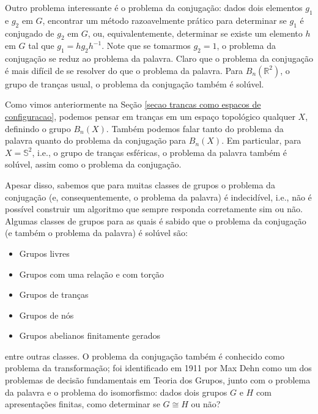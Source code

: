 	\par\vspace{0.3cm} Outro problema interessante é o problema da conjugação: dados dois elementos 
	$g_1$ e $g_2$ em $G$, encontrar um método razoavelmente prático para determinar se $g_1$ é conjugado de 
	$g_2$ em $G$, ou, equivalentemente, determinar se existe um elemento $h$ em $G$ tal que $g_1 = hg_2h^{-1}$. 
	Note que se tomarmos $g_2 = 1$, o problema da conjugação se reduz ao problema da palavra. Claro que o 
	problema da conjugação é mais difícil de se resolver do que o problema da palavra. Para $B_n(\mathbb{R}^2)$, 
	o grupo de tranças usual, o problema da conjugação também é solúvel.
	
	\par\vspace{0.3cm} Como vimos anteriormente na Seção \ref{secao trancas como espacos de configuracao}, 
	podemos pensar em tranças em um espaço topológico qualquer $X$, definindo o grupo $B_n(X)$. Também 
	podemos falar tanto do problema da palavra quanto do problema da conjugação para $B_n(X)$. Em particular, 
	para $X = \mathbb{S}^2$, i.e., o grupo de tranças esféricas, o problema da palavra também é solúvel, 
	assim como o problema da conjugação.
	
	\par\vspace{0.3cm} Apesar disso, sabemos que para muitas classes de grupos o problema da conjugação 
	(e, consequentemente, o problema da palavra) é indecidível, i.e., não é possível construir um algoritmo 
	que sempre responda corretamente sim ou não. Algumas classes de grupos para as quais é sabido que o 
	problema da conjugação (e também o problema da palavra) é solúvel são:
	\begin{itemize}
		\item Grupos livres
		\item Grupos com uma relação e com torção
		\item Grupos de tranças
		\item Grupos de nós
		\item Grupos abelianos finitamente gerados
	\end{itemize}
	entre outras classes. O problema da conjugação também é conhecido como problema da
	transformação; foi identificado em 1911 por Max Dehn como um dos problemas de decisão fundamentais 
	em Teoria dos Grupos, junto com o problema da palavra e o problema do isomorfismo: dados dois grupos 
	$G$ e $H$ com apresentações finitas, como determinar se $G\cong H$ ou não?
